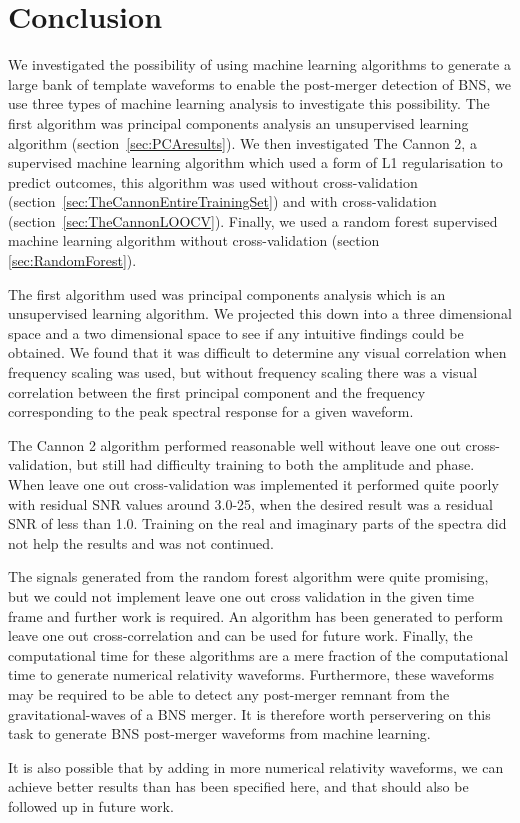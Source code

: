 \section{Conclusion}
We investigated the possibility of using machine learning algorithms to generate a large bank of template waveforms to enable the post-merger detection of BNS, we use three types of machine learning analysis to investigate this possibility. The first algorithm was principal components analysis an unsupervised learning algorithm (section~\ref{sec:PCAresults}). We then investigated The Cannon 2, a supervised machine learning algorithm which used a form of L1 regularisation to predict outcomes, this algorithm was used without cross-validation (section~\ref{sec:TheCannonEntireTrainingSet}) and with cross-validation (section~\ref{sec:TheCannonLOOCV}). Finally, we used a random forest supervised machine learning algorithm without cross-validation (section \ref{sec:RandomForest}). \par


The first algorithm used was principal components analysis which is an unsupervised learning algorithm. We projected this down into a three dimensional space and a two dimensional space to see if any intuitive findings could be obtained. We found that it was difficult to determine any visual correlation when frequency scaling was used, but without frequency scaling there was a visual correlation between the first principal component and the frequency corresponding to the peak spectral response for a given waveform. \par

The Cannon 2 algorithm performed reasonable well without leave one out cross-validation, but still had difficulty training to both the amplitude and phase. When leave one out cross-validation was implemented it performed quite poorly with residual SNR values around 3.0-25, when the desired result was a residual SNR of  less than 1.0. Training on the real and imaginary parts of the spectra did not help the results and was not continued. \par

The signals generated from the random forest algorithm were quite promising, but we could not implement leave one out cross validation in the given time frame and further work is required. An algorithm has been generated to perform leave one out cross-correlation and can be used for future work. Finally, the computational time for these algorithms are a mere fraction of the computational time to generate numerical relativity waveforms. Furthermore, these waveforms may be required to be able to detect any post-merger remnant from the gravitational-waves of a BNS merger. It is therefore worth perservering on this task to generate BNS post-merger waveforms from machine learning.\par
It is also possible that  by adding in more numerical relativity waveforms, we can achieve better results than has been specified here, and that should also be followed up in future work.



